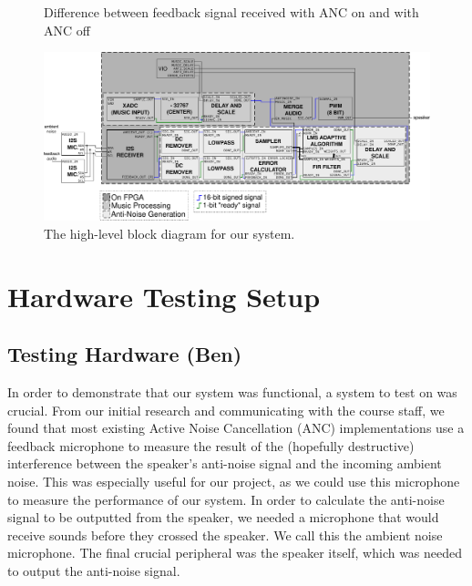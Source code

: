 \documentclass{fpgairpods}
\begin{document}
\begin{figure}
    \centering
    \caption{Difference between feedback signal received with ANC on and with ANC off}
    \label{chart:anc_freq_response}
\end{figure}

\begin{figure}
\includegraphics[width=\textheight]{./figs/block_diagram.pdf}
\caption{The high-level block diagram for our system.}
\label{fig:blockdiagram}
\end{figure}

\newpage
\section{Hardware Testing Setup}
\subsection{Testing Hardware (Ben)}
In order to demonstrate that our system was functional, a system to test on was crucial. From our initial research and communicating with the course staff, we found that most existing Active Noise Cancellation (ANC) implementations use a feedback microphone to measure the result of the (hopefully destructive) interference between the speaker's anti-noise signal and the incoming ambient noise. This was especially useful for our project, as we could use this microphone to measure the performance of our system. In order to calculate the anti-noise signal to be outputted from the speaker, we needed a microphone that would receive sounds before they crossed the speaker. We call this the ambient noise microphone. The final crucial peripheral was the speaker itself, which was needed to output the anti-noise signal. 
\end{document}
